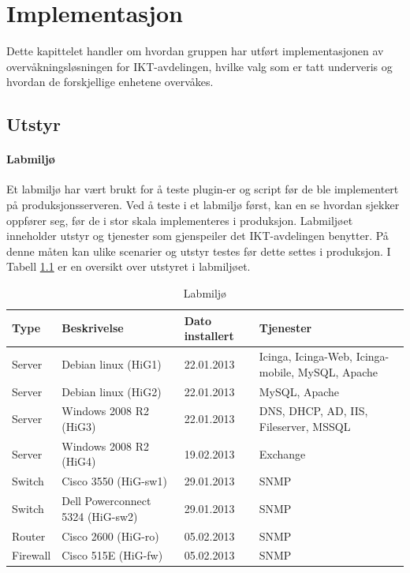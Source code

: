 \chapter{Implementasjon}
Dette kapittelet handler om hvordan gruppen har utført implementasjonen av overvåkningsløsningen for IKT-avdelingen, hvilke valg som er tatt underveris og hvordan de forskjellige enhetene overvåkes.
\clearpage
\section{Utstyr}

\subsubsection{Labmiljø}
Et labmiljø har vært brukt for å teste plugin-er og script før de ble implementert på produksjonsserveren. Ved å teste i et labmiljø først, kan en se hvordan sjekker oppfører seg, før de i stor skala implementeres i produksjon. Labmiljøet inneholder utstyr og tjenester som gjenspeiler det IKT-avdelingen benytter. På denne måten kan ulike scenarier og utstyr testes før dette settes i produksjon. I Tabell \ref{labmiljo} er en oversikt over utstyret i labmiljøet.
\begin{changemargin}{-1cm}{-1cm}
\begin{table}[H]
\begin{center}
\begin{tabular}{ | l | l | l | p{4cm} |} \hline
	\textbf{Type} & \textbf{Beskrivelse} & \textbf{Dato installert} & \textbf{Tjenester} \\ \hline
	Server & Debian linux (HiG1) & 22.01.2013 & Icinga, Icinga-Web, Icinga-mobile, MySQL, Apache \\ \hline
	Server & Debian linux (HiG2) & 22.01.2013 &	MySQL, Apache \\ \hline
	Server & Windows 2008 R2 (HiG3) & 22.01.2013 & DNS, DHCP, AD, IIS, Fileserver, MSSQL \\ \hline
	Server & Windows 2008 R2 (HiG4) & 19.02.2013 & Exchange \\ \hline 
	Switch & Cisco 3550 (HiG-sw1) &	29.01.2013 & SNMP \\ \hline
	Switch & Dell Powerconnect 5324 (HiG-sw2) & 29.01.2013 & SNMP \\ \hline
	Router & Cisco 2600 (HiG-ro) & 05.02.2013 & SNMP \\ \hline 
	Firewall & Cisco 515E (HiG-fw) & 05.02.2013 & SNMP \\ \hline
\end{tabular}
\caption{Labmiljø}
\label{labmiljo}
\end{center}
\end{table}
\end{changemargin}
